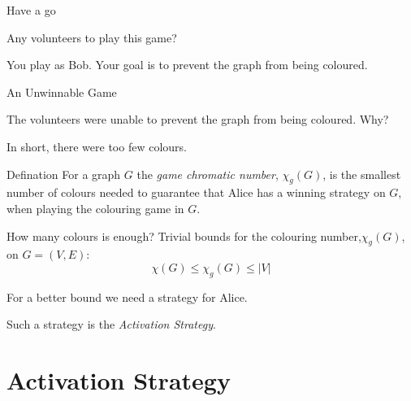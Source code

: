\documentclass{beamer}
\begin{document}
\begin{frame}{\secname}{Have a go}
    
    
    Any volunteers to play this game?
    
    \bigskip
    
    You play as Bob. Your goal is to prevent the graph from being coloured.
    
\end{frame}


\begin{frame}{\secname}{An Unwinnable Game}
    
    
    The volunteers were unable to prevent the graph from being coloured. Why?
    
    \bigskip
    
    In short, there were too few colours.
    
    
    \bigskip
    \pause
    
    \begin{block}{Defination}
        For a graph $G$ the \textit{game chromatic number}, $\chi_g(G)$, is the smallest number of colours needed to guarantee that Alice has a winning strategy on $G$, when playing the colouring game in $G$.
    \end{block}
   
\end{frame}

\begin{frame}{\secname}{How many colours is enough?}
    Trivial bounds for the colouring number,$\chi_g(G)$, on $G=(V,E)$:
    \[\chi(G) \leq \chi_g(G) \leq |V|\]
    
    \bigskip
    
    For a better bound we need a strategy for Alice.
    
    \bigskip
    \pause
    
    Such a strategy is the \textit{Activation Strategy}.
\end{frame}


\section{Activation Strategy}
\end{document}
